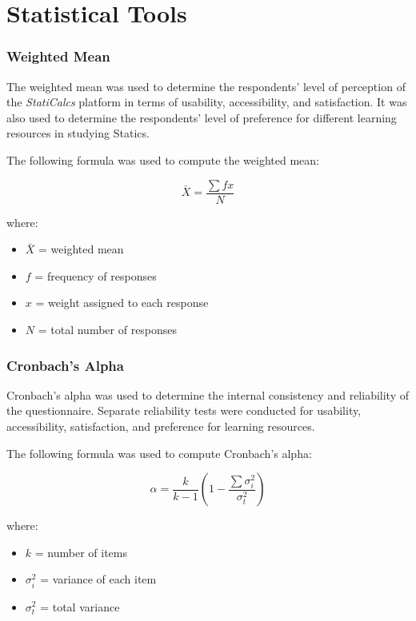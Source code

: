 \section{Statistical Tools}\label{sec:3-stat}

\subsubsection*{Weighted Mean}

The weighted mean was used to determine the respondents’ level of perception of the \textit{StatiCalcs} platform in terms of usability, accessibility, and satisfaction. It was also used to determine the respondents’ level of preference for different learning resources in studying Statics.  

The following formula was used to compute the weighted mean:

\[
\bar{X} = \frac{\sum f x}{N}
\]

where:  

\begin{itemize}
    \item $\bar{X}$ = weighted mean
    \item $f$ = frequency of responses
    \item $x$ = weight assigned to each response
    \item $N$ = total number of responses
\end{itemize}

\subsubsection*{Cronbach’s Alpha}

Cronbach’s alpha was used to determine the internal consistency and reliability of the questionnaire. Separate reliability tests were conducted for usability, accessibility, satisfaction, and preference for learning resources.  

The following formula was used to compute Cronbach’s alpha:

\[
\alpha = \frac{k}{k-1}\left(1-\frac{\sum \sigma_i^2}{\sigma_t^2}\right)
\]

where:  

\begin{itemize}
    \item $k$ = number of items
    \item $\sigma_i^2$ = variance of each item
    \item $\sigma_t^2$ = total variance
\end{itemize}

